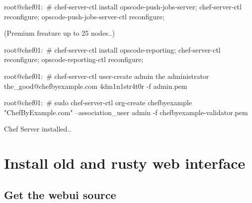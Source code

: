 \begin{codelisting}
\label{code:}
\codecaption{}
\begin{code}
root@chef01:~# chef-server-ctl install opscode-push-jobs-server; chef-server-ctl reconfigure; opscode-push-jobs-server-ctl reconfigure;
\end{code}
\end{codelisting}


(Premium freature up to 25 nodes..)
\begin{codelisting}
\label{code:}
\codecaption{}
\begin{code}
root@chef01:~# chef-server-ctl install opscode-reporting; chef-server-ctl reconfigure; opscode-reporting-ctl reconfigure; 
\end{code}
\end{codelisting}


\begin{codelisting}
\label{code:}
\codecaption{}
\begin{code}
root@chef01:~# chef-server-ctl user-create admin the administrator the_good@chefbyexample.com 4dm1n1str4t0r -f admin.pem
\end{code}
\end{codelisting}


\begin{codelisting}
\label{code:}
\codecaption{}
\begin{code}
root@chef01:~# sudo chef-server-ctl org-create chefbyexample "ChefByExample.com" --association_user admin -f chefbyexample-validator.pem
\end{code}
\end{codelisting}


Chef Server installed..

\section{Install old and rusty web interface}

\subsection{Get the webui source}

